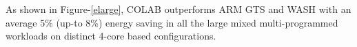As shown in Figure-\ref{elarge}, COLAB outperforms ARM GTS and WASH with an average 5\% (up-to 8\%) energy saving in all the large mixed multi-programmed workloads on distinct 4-core based configurations.




